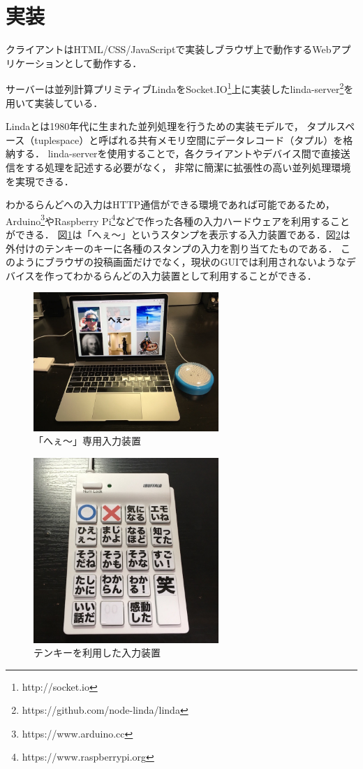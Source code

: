 \section{実装}

クライアントはHTML/CSS/JavaScriptで実装しブラウザ上で動作するWebアプリケーションとして動作する．

サーバーは並列計算プリミティブLindaをSocket.IO\footnote{http://socket.io}上に実装したlinda-server\footnote{https://github.com/node-linda/linda}を用いて実装している．

Lindaとは1980年代に生まれた並列処理を行うための実装モデルで，
タプルスペース（tuplespace）と呼ばれる共有メモリ空間にデータレコード（タプル）を格納する．
linda-serverを使用することで，各クライアントやデバイス間で直接送信をする処理を記述する必要がなく，
非常に簡潔に拡張性の高い並列処理環境を実現できる．

わかるらんどへの入力はHTTP通信ができる環境であれば可能であるため，
Arduino\footnote{https://www.arduino.cc}やRaspberry Pi\footnote{https://www.raspberrypi.org}などで作った各種の入力ハードウェアを利用することができる．
図\ref{button}は「へぇ〜」というスタンプを表示する入力装置である．図\ref{10key}は外付けのテンキーのキーに各種のスタンプの入力を割り当てたものである．
このようにブラウザの投稿画面だけでなく，現状のGUIでは利用されないようなデバイスを作ってわかるらんどの入力装置として利用することができる．

\begin{figure}[h]
\centering
\includegraphics[width=7cm]{images/button.png}
\caption{「へぇ〜」専用入力装置}
\label{button}
\end{figure}

\begin{figure}[h]
\centering
\includegraphics[width=7cm]{images/10key.png}
\caption{テンキーを利用した入力装置}
\label{10key}
\end{figure}